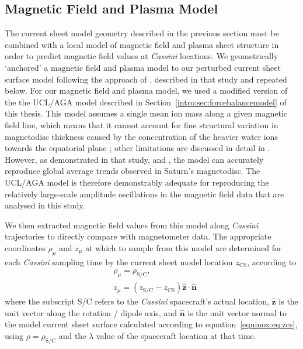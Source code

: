 \subsection{Magnetic Field and Plasma Model}\label{equinox:sec:plasmamodel}
The current sheet model geometry described in the previous section must be combined with a local model of magnetic field and plasma sheet structure in order to predict magnetic field values at \textit{Cassini} locations. We geometrically `anchored' a magnetic field and plasma model to our perturbed current sheet surface model following the approach of \citet{achilleos2014}, described in that study and repeated below. For  our magnetic field and plasma model, we used a modified version of the the UCL/AGA model described in Section~\ref{intro:sec:forcebalancemodel} of this thesis. This model assumes a single mean ion mass along a given magnetic field line, which means that it cannot account for fine structural variation in magnetodisc thickness caused by the concentration of the heavier water ions towards the equatorial plane \citep[e.g.][]{persoon2009, nemeth2011}; other limitations are discussed in detail in \citet{achilleos2010a}. However, as demonstrated in that study, and \citet{achilleos2010b, sergis2018}, the model can accurately reproduce global average trends observed in Saturn's magnetodisc. The UCL/AGA model is therefore demonstrably adequate for reproducing the relatively large-scale amplitude oscillations in the magnetic field data that are analysed in this study.

We then extracted magnetic field values from this model along \textit{Cassini} trajectories to directly compare with magnetometer data. The appropriate coordinates $\rho_\mu$ and $z_\mu$ at which to sample from this model are determined for each \textit{Cassini} sampling time by the current sheet model location $z_\mathrm{CS}$, according to
\begin{align}\label{equinox:eq:coordinatetransform}
& \rho_\mu = \rho_\mathrm{S/C},\nonumber\\
& z_\mu = (z_\mathrm{S/C} - z_\mathrm{CS})\hat{\boldsymbol{z}}\cdot\hat{\boldsymbol{n}}
\end{align}
where the subscript S/C refers to the \textit{Cassini} spacecraft's actual location, $\hat{\boldsymbol{z}}$ is the unit vector along the rotation / dipole axis, and $\hat{\boldsymbol{n}}$ is the unit vector normal to the model current sheet surface calculated according to equation~\ref{equinox:eq:zcs}, using $\rho = \rho_\mathrm{S/C}$ and the $\lambda$ value of the spacecraft location at that time.

